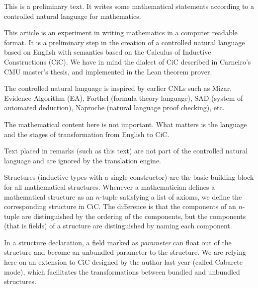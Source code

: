 \documentclass[12pt]{article}
\numberwithin{definition}{section}
\begin{document}
\begin{cnl}






\begin{remark}
This is a preliminary text.  It
writes some mathematical statements according to a
controlled natural language for mathematics.
\end{remark}



\begin{remark}
This article is an experiment in writing mathematics in a computer
readable format.  It is a preliminary step in the creation of a
controlled natural language based on English with semantics based on
the Calculus of Inductive Constructions (CiC).  We have in mind the
dialect of CiC described in Carneiro's CMU master's thesis, and
implemented in the Lean theorem prover.

The controlled natural language is inspired by earlier CNLs such as
Mizar, Evidence Algorithm (EA), Forthel (formula theory language), SAD
(system of automated deduction), Naproche (natural language proof
checking), etc.

The mathematical content here is not important.  What matters is the
language and the stages of transformation from English to CiC.

Text placed in remarks (such as this text) are not part of the
controlled natural language and are ignored by the translation engine.
\end{remark}




\begin{remark}
Structures (inductive types with a single constructor) are the basic
building block for all mathematical structures. Whenever a
mathematician defines a mathematical structure as an $n$-tuple
satisfying a list of axioms, we define the corresponding
structure in CiC. The difference is that the components of an
$n$-tuple are distinguished by the ordering of the components, but the
components (that is fields) of a structure are distinguished by naming
each component.

In a structure declaration, a field marked as {\it parameter} can float out
of the structure and become an unbundled parameter to the structure.
We are relying here on an extension to CiC designed by the author last
year (called Cabarete mode), which facilitates the transformations
between bundled and unbundled structures.


\end{remark}
\end{cnl}
\end{document}
